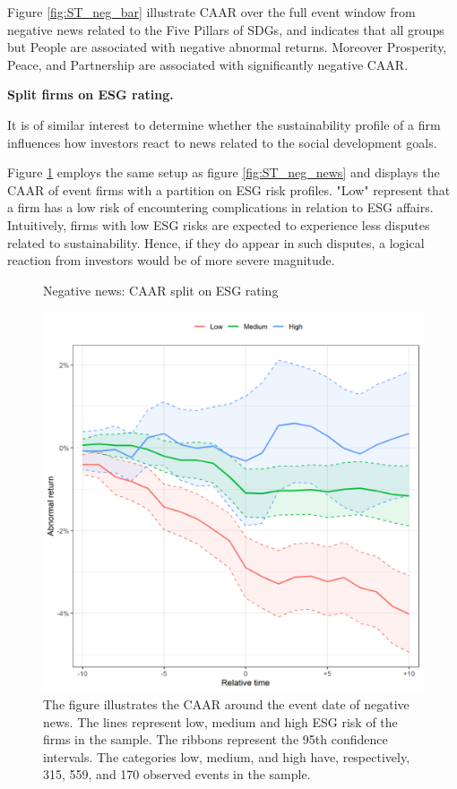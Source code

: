 Figure \ref{fig:ST_neg_bar} illustrate CAAR over the full event window from negative news related to the Five Pillars of SDGs, and indicates that all groups but People are associated with negative abnormal returns. Moreover Prosperity, Peace, and Partnership are associated with significantly negative CAAR.      

\noindent \textbf{Split firms on ESG rating.} 

It is of similar interest to determine whether the sustainability profile of a firm influences how investors react to news related to the social development goals. 

Figure \ref{fig:ST_neg_ESG} employs the same setup as figure \ref{fig:ST_neg_news} and displays the CAAR of event firms with a partition on ESG risk profiles. "Low" represent that a firm has a low risk of encountering complications in relation to ESG affairs. Intuitively, firms with low ESG risks are expected to experience less disputes related to sustainability. Hence, if they do appear in such disputes, a logical reaction from investors would be of more severe magnitude. 

\begin{figure} [H]
    \centering
    \caption{Negative news: CAAR split on ESG rating}
    \includegraphics[scale=0.6]{Projekt/1.Figures analysis/ST_negative_ESG.png}
     \caption*{\footnotesize The figure illustrates the CAAR around the event date of negative news. The lines represent low, medium and high ESG risk of the firms in the sample. The ribbons represent the 95th confidence intervals. The categories low, medium, and high have, respectively, 315, 559, and 170 observed events in the sample. }
    \label{fig:ST_neg_ESG}
\end{figure} 


